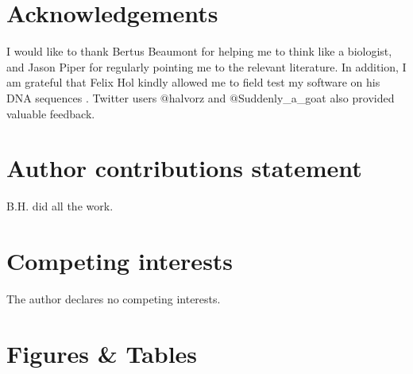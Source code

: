 \documentclass[fleqn,10pt]{wlscirep}
\begin{document}
\section*{Acknowledgements} 

I would like to thank Bertus Beaumont for helping me to think like a biologist, and Jason Piper for regularly pointing me to the relevant literature. In addition, I am grateful that Felix Hol kindly allowed me to field test my software on his DNA sequences \cite{hol_density-dependent_2016}. Twitter users $@$halvorz and $@$Suddenly\_a\_goat also provided valuable feedback.

\section*{Author contributions statement}

B.H. did all the work.

\section*{Competing interests}
The author declares no competing interests.

\section*{Figures \& Tables}
\newcommand{\comment}[1]{}

\comment{
}
\end{document}
